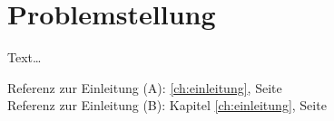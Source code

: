\section{Problemstellung}
\label{sec:problemstellung}

Text\dots

\bigskip

Referenz zur Einleitung (A): \autoref{ch:einleitung}, Seite \pageref{ch:einleitung} \\
Referenz zur Einleitung (B): Kapitel \ref{ch:einleitung}, Seite \pageref{ch:einleitung} \\
